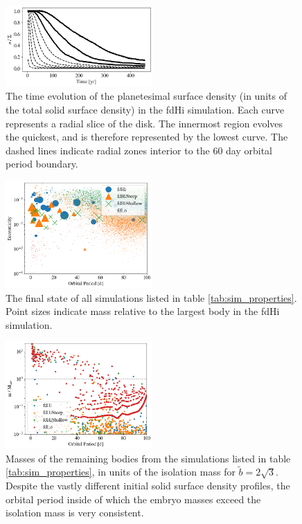 \documentclass[twocolumn]{aastex63}
\begin{document}
\begin{figure}
\begin{center}
    \includegraphics[width=0.5\textwidth]{figures/pl_frac_time.png}
    \caption{The time evolution of the planetesimal surface density (in units of the total solid surface density) in the fdHi simulation. Each curve represents a radial slice of the disk. The innermost region evolves the quickest, and is therefore represented by the lowest curve. The dashed lines indicate radial zones interior to the 60 day orbital period boundary.\label{fig:pl_frac_time}}
\end{center}
\end{figure}

\begin{figure}
\begin{center}
    \includegraphics[width=0.5\textwidth]{figures/surfden_profiles.png}
    \caption{The final state of all simulations listed in table \ref{tab:sim_properties}. Point sizes indicate mass relative to the largest body in the fdHi simulation.\label{fig:surfden_profiles}}
\end{center}
\end{figure}

\begin{figure}
\begin{center}
    \includegraphics[width=0.5\textwidth]{figures/surfden_iso.png}
    \caption{Masses of the remaining bodies from the simulations
      listed in table \ref{tab:sim_properties}, in units of the
      isolation mass for $\tilde{b} = 2 \sqrt{3}$. Despite the vastly different initial solid surface density profiles, the orbital period inside of which the embryo masses exceed the isolation mass is very consistent.\label{fig:surfden_iso}}
\end{center}
\end{figure}
\end{document}
